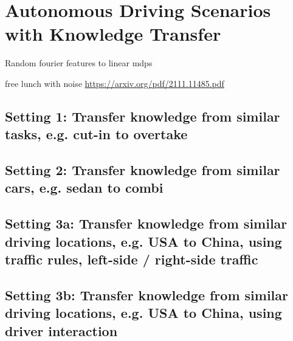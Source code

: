 
\section{Autonomous Driving Scenarios with Knowledge Transfer}\label{sec:ad_experiments}

Random fourier features to linear mdps

free lunch with noise \url{https://arxiv.org/pdf/2111.11485.pdf}

\subsection{Setting 1: Transfer knowledge from similar tasks, e.g. cut-in to overtake}


\subsection{Setting 2: Transfer knowledge from similar cars, e.g. sedan to combi}


\subsection{Setting 3a: Transfer knowledge from similar driving locations, e.g. USA to China, using traffic rules, left-side / right-side traffic}


\subsection{Setting 3b: Transfer knowledge from similar driving locations, e.g. USA to China, using driver interaction}





